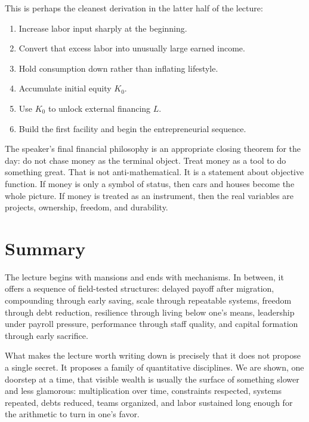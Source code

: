 This is perhaps the cleanest derivation in the latter half of the lecture:
\begin{enumerate}
\item Increase labor input sharply at the beginning.
\item Convert that excess labor into unusually large earned income.
\item Hold consumption down rather than inflating lifestyle.
\item Accumulate initial equity \(K_0\).
\item Use \(K_0\) to unlock external financing \(L\).
\item Build the first facility and begin the entrepreneurial sequence.
\end{enumerate}

The speaker's final financial philosophy is an appropriate closing theorem for the day: do not chase money as the terminal object. Treat money as a tool to do something great. That is not anti-mathematical. It is a statement about objective function. If money is only a symbol of status, then cars and houses become the whole picture. If money is treated as an instrument, then the real variables are projects, ownership, freedom, and durability.

\section{Summary}

The lecture begins with mansions and ends with mechanisms. In between, it offers a sequence of field-tested structures: delayed payoff after migration, compounding through early saving, scale through repeatable systems, freedom through debt reduction, resilience through living below one's means, leadership under payroll pressure, performance through staff quality, and capital formation through early sacrifice.

What makes the lecture worth writing down is precisely that it does not propose a single secret. It proposes a family of quantitative disciplines. We are shown, one doorstep at a time, that visible wealth is usually the surface of something slower and less glamorous: multiplication over time, constraints respected, systems repeated, debts reduced, teams organized, and labor sustained long enough for the arithmetic to turn in one's favor.
